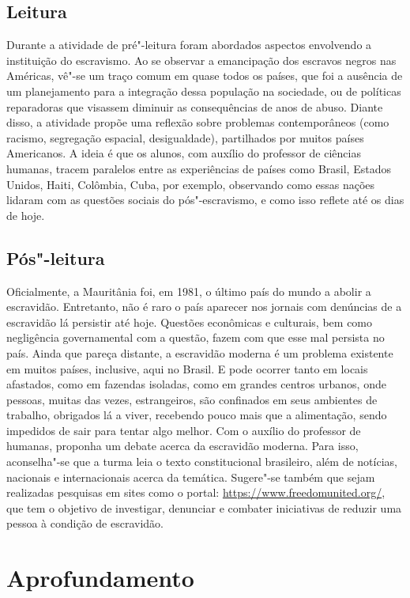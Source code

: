 \documentclass[12pt]{extarticle}
\begin{document}
\subsection{Leitura}

Durante a atividade de pré"-leitura foram abordados aspectos
envolvendo a instituição do escravismo. Ao se observar a emancipação dos
escravos negros nas Américas, vê"-se um traço comum em quase todos os
países, que foi a ausência de um planejamento para a integração dessa
população na sociedade, ou de políticas reparadoras que visassem
diminuir as consequências de anos de abuso. Diante disso, a atividade
propõe uma reflexão sobre problemas contemporâneos (como racismo,
segregação espacial, desigualdade), partilhados por muitos países
Americanos. A ideia é que os alunos, com auxílio do professor de
ciências humanas, tracem paralelos entre as experiências de países como
Brasil, Estados Unidos, Haiti, Colômbia, Cuba, por exemplo, observando
como essas nações lidaram com as questões sociais do pós"-escravismo, e
como isso reflete até os dias de hoje.

\subsection{Pós"-leitura}

Oficialmente, a Mauritânia foi, em 1981, o último país do
mundo a abolir a escravidão. Entretanto, não é raro o país aparecer nos
jornais com denúncias de a escravidão lá persistir até hoje. Questões
econômicas e culturais, bem como negligência governamental com a
questão, fazem com que esse mal persista no país. Ainda que pareça
distante, a escravidão moderna é um problema existente em muitos países,
inclusive, aqui no Brasil. E pode ocorrer tanto em locais afastados,
como em fazendas isoladas, como em grandes centros urbanos, onde
pessoas, muitas das vezes, estrangeiros, são confinados em seus
ambientes de trabalho, obrigados lá a viver, recebendo pouco mais que a
alimentação, sendo impedidos de sair para tentar algo melhor. Com o
auxílio do professor de humanas, proponha um debate acerca da escravidão
moderna. Para isso, aconselha"-se que a turma leia o texto constitucional
brasileiro, além de notícias, nacionais e internacionais acerca da
temática. Sugere"-se também que sejam realizadas pesquisas em sites como
o portal:
\url{https://www.freedomunited.org/}, que tem o objetivo de investigar, denunciar e combater iniciativas de reduzir uma pessoa à condição de escravidão.

\section{Aprofundamento}
\end{document}
